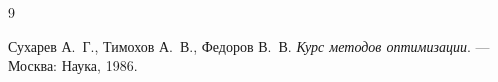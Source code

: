 \begin{thebibliography}{9}

Сухарев А.~Г., Тимохов А.~В., Федоров В.~В.
\textit{Курс методов оптимизации}.
--- Москва: Наука, 1986.

\end{thebibliography}